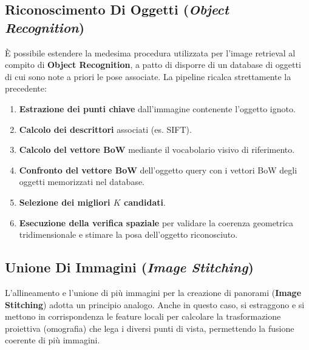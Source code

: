 ﻿\documentclass[11pt, a4paper]{article}
\begin{document}
\subsection{Riconoscimento Di Oggetti (\emph{Object Recognition})}

È possibile estendere la medesima procedura utilizzata per l'image retrieval al compito di \textbf{Object Recognition}, a patto di disporre di un database di oggetti di cui sono note a priori le pose associate. La pipeline ricalca strettamente la precedente:

\begin{enumerate}
    \item \textbf{Estrazione dei punti chiave} dall'immagine contenente l'oggetto ignoto.
    \item \textbf{Calcolo dei descrittori} associati (es. SIFT).
    \item \textbf{Calcolo del vettore BoW} mediante il vocabolario visivo di riferimento.
    \item \textbf{Confronto del vettore BoW} dell'oggetto query con i vettori BoW degli oggetti memorizzati nel database.
    \item \textbf{Selezione dei migliori $K$ candidati}.
    \item \textbf{Esecuzione della verifica spaziale} per validare la coerenza geometrica tridimensionale e stimare la posa dell'oggetto riconosciuto.
\end{enumerate}


\subsection{Unione Di Immagini (\emph{Image Stitching})}

L'allineamento e l'unione di più immagini per la creazione di panorami (\textbf{Image Stitching}) adotta un principio analogo. Anche in questo caso, si estraggono e si mettono in corrispondenza le feature locali per calcolare la trasformazione proiettiva (omografia) che lega i diversi punti di vista, permettendo la fusione coerente di più immagini.

\end{document}
